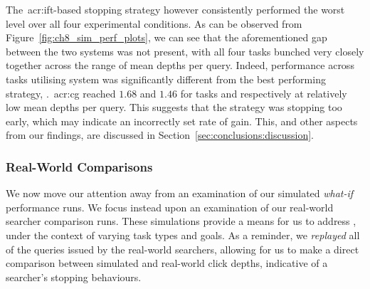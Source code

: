 The~\gls{acr:ift}-based stopping strategy  however consistently performed the worst level over all four experimental conditions. As can be observed from Figure~\ref{fig:ch8_sim_perf_plots}, we can see that the aforementioned gap between the two systems was not present, with all four tasks bunched very closely together across the range of mean depths per query. Indeed, performance across tasks utilising system  was significantly different from the best performing strategy, .~\gls{acr:cg} reached $1.68$ and $1.46$ for tasks  and  respectively at relatively low mean depths per query. This suggests that the strategy was stopping too early, which may indicate an incorrectly set rate of gain. This, and other aspects from our findings, are discussed in Section~\ref{sec:conclusions:discussion}.

\subsubsection{Real-World Comparisons}\label{sec:diversity:simulated:results:comparisons}
We now move our attention away from an examination of our simulated \emph{what-if} performance runs. We focus instead upon an examination of our real-world searcher comparison runs. These simulations provide a means for us to address , under the context of varying task types and goals. As a reminder, we \emph{replayed} all of the queries issued by the real-world searchers, allowing for us to make a direct comparison between simulated and real-world click depths, indicative of a searcher's stopping behaviours.

